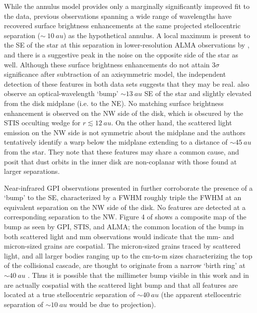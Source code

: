 \documentclass[modern]{aastex62}
\begin{document}
While the annulus model provides only a marginally significantly improved fit to the data, previous observations spanning a wide range of wavelengths have recovered surface brightness enhancements at the same projected stellocentric separation ($\sim~\SI{10}{au}$) as the hypothetical annulus.
A local maximum is present to the SE of the star at this separation in lower-resolution ALMA observations by \cite{macgregor13}, and there is a suggestive peak in the noise on the opposite side of the star as well.
Although these surface brightness enhancements do not attain $3 \sigma$ significance after subtraction of an axisymmetric model, the independent detection of these features in both data sets suggests that they may be real.  
\cite{schneider14} also observe an optical-wavelength `bump' $\sim \SI{13}{au}$ SE of the star and slightly elevated from the disk midplane (i.e. to the NE).
No matching surface brightness enhancement is observed on the NW side of the disk, which is obscured by the STIS occulting wedge for $r \lesssim \SI{12}{au}$.
On the other hand, the scattered light emission on the NW side is not symmetric about the midplane and the authors tentatively identify a warp below the midplane extending to a distance of $\sim \SI{45}{au}$ from the star.
They note that these features may share a common cause, and posit that dust orbits in the inner disk are non-coplanar with those found at larger separations.

Near-infrared GPI observations presented in \cite{wang15} further corroborate the presence of a `bump' to the SE, characterized by a FWHM roughly triple the FWHM at an equivalent separation on the NW side of the disk. 
No features are detected at a corresponding separation to the NW.
Figure 4 of \cite{wang15} shows a composite map of the bump as seen by GPI, STIS, and ALMA; the common location of the bump in both scattered light and mm observations would indicate that the mm- and micron-sized grains are cospatial.
The micron-sized grains traced by scattered light, and all larger bodies ranging up to the cm-to-m sizes characterizing the top of the collisional cascade, are thought to originate from a narrow `birth ring' at $\sim \SI{40}{au}$ \citep{strubbe&chiang06}. 
Thus it is possible that the millimeter bump visible in this work and in \cite{macgregor13}
are actually cospatial with the scattered light bump and that all features are located at a true
stellocentric separation of $\sim \SI{40}{au}$ (the apparent stellocentric separation
of $\sim \SI{10}{au}$ would be due to projection).
\end{document}
